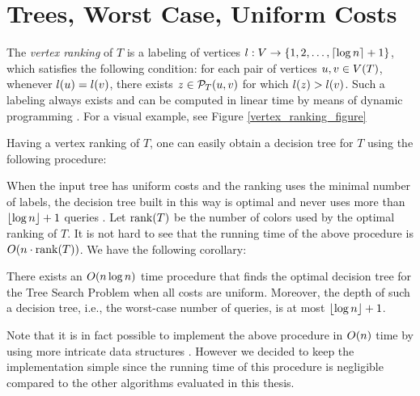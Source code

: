 \newpage
{}
\section{Trees, Worst Case, Uniform Costs}
\label{sec:trees_uniform_costs}


The \textit{vertex ranking} of $T$ is a labeling of vertices $l:V\to \mathopen{}\left\{ 1,2,\dots,\mathopen{}\left\lceil \log n \right\rceil+1 \right\}$, which satisfies the following condition: for each pair of vertices $u,v\in V\mathopen{}\left( T \right)$, whenever $l\mathopen{}\left( u \right)=l\mathopen{}\left( v \right)$, there exists $z\in \mathcal{P}_T\mathopen{}\left( u,v \right)$ for which $l\mathopen{}\left( z \right)>l\mathopen{}\left( v \right)$. Such a labeling always exists and can be computed in linear time by means of dynamic programming \cite{Schaffer1989OptNodeRankOfTsInLinTime, OnakParys2006GenOfBSSInTsAndFLikePosets, Mozes_Onak2008FindOptTSStartInLinTime}. For a visual example, see Figure \ref{vertex_ranking_figure}


Having a vertex ranking of $T$, one can easily obtain a decision tree for $T$ using the following procedure:



When the input tree has uniform costs and the ranking uses the minimal number of labels, the decision tree built in this way is optimal and never uses more than $\mathopen{}\left\lfloor \log n \right\rfloor + 1$ queries \cite{OnakParys2006GenOfBSSInTsAndFLikePosets}. Let $\operatorname{rank}\mathopen{}\left( T \right)$ be the number of colors used by the optimal ranking of $T$. It is not hard to see that the running time of the above procedure is $O\mathopen{}\left( n\cdot \operatorname{rank}\mathopen{}\left( T \right) \right)$. We have the following corollary:
  
\begin{corollary}\label{vertexRankingCorollary}
    There exists an $O\mathopen{}\left( n\log n \right)$ time procedure \FRankingBasedDT that finds the optimal decision tree for the Tree Search Problem when all costs are uniform. Moreover, the depth of such a decision tree, i.e., the worst-case number of queries, is at most $\mathopen{}\left\lfloor \log n \right\rfloor + 1$.
\end{corollary}

Note that it is in fact possible to implement the above procedure in $O\mathopen{}\left( n \right)$ time by using more intricate data structures \cite{OnakParys2006GenOfBSSInTsAndFLikePosets,Mozes_Onak2008FindOptTSStartInLinTime}. However we decided to keep the implementation simple since the running time of this procedure is negligible compared to the other algorithms evaluated in this thesis.

